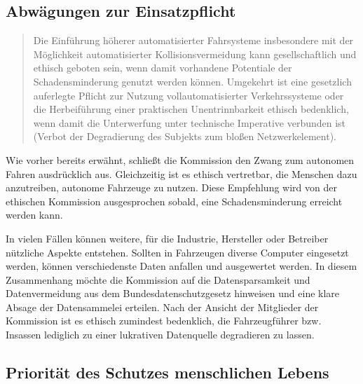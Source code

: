 \documentclass[twoside,a4paper,12pt]{article}
\begin{document}
\subsection{Abwägungen zur Einsatzpflicht} \label{AbwaegungenZurEinsatzpflicht}

\begin{quote}
\glqq
Die Einführung höherer automatisierter Fahrsysteme insbesondere mit der Möglichkeit
automatisierter Kollisionsvermeidung kann gesellschaftlich und ethisch geboten sein,
wenn damit vorhandene Potentiale der Schadensminderung genutzt werden können.
Umgekehrt ist eine gesetzlich auferlegte Pflicht zur Nutzung vollautomatisierter Verkehrssysteme oder die Herbeiführung 
einer praktischen Unentrinnbarkeit ethisch bedenklich, wenn damit die Unterwerfung unter technische Imperative verbunden 
ist (Verbot der Degradierung des Subjekts zum bloßen Netzwerkelement).\grqq\mbox{~\cite[S. 11]{ek}}
\end{quote}
Wie vorher bereits erwähnt, schließt die Kommission den Zwang zum autonomen Fahren ausdrücklich aus. Gleichzeitig ist es ethisch vertretbar, die Menschen dazu anzutreiben, autonome Fahrzeuge zu nutzen. Diese Empfehlung wird von der ethischen Kommission ausgesprochen sobald, eine Schadensminderung erreicht werden kann.

In vielen Fällen können weitere, für die Industrie, Hersteller oder Betreiber nützliche Aspekte entstehen. Sollten in Fahrzeugen diverse Computer eingesetzt werden, können verschiedenste Daten anfallen und ausgewertet werden. In diesem Zusammenhang möchte die Kommission auf die Datensparsamkeit und Datenvermeidung aus dem Bundesdatenschutzgesetz hinweisen und eine klare Absage der Datensammelei erteilen. Nach der Ansicht der Mitglieder der Kommission ist es ethisch zumindest bedenklich, die Fahrzeugführer bzw. Insassen lediglich zu einer lukrativen Datenquelle degradieren zu lassen.


\subsection{Priorität des Schutzes menschlichen Lebens} \label{PrioritäDesSchutzesMenschlichenLebens}
\end{document}
